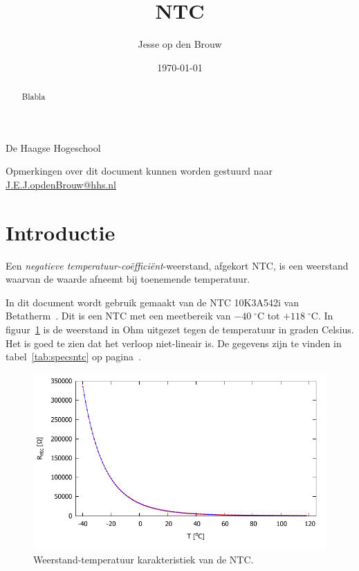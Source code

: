 \documentclass[12pt,a4paper,final,twoside,fleqn]{article}
\author{Jesse op den Brouw}
\title{NTC}
\date{\today}
\makeatletter
\def\maketitle{%
  \null
  \thispagestyle{empty}%
  \vskip 3cm
  \begin{center}\leavevmode
    {\LARGE \@title\par}%
    \vskip 1cm
    {\large \@author\par}%
    \vskip 0.03cm
    {\large De Haagse Hogeschool\par}%
    \vskip 0.03cm
    {\large \@date\par}%
  \end{center}%
  \vfill
  \null
}
\newcommand{\figscale}{1.0}
\newcommand{\mathcelc}[1]{\mbox{$#1\;^\circ\text{C}$}}
\newcommand{\ntctype}{10K3A542i}
\newcommand{\ntcman}{Betatherm}
\makeatother
\begin{document}
\raggedbottom

\maketitle
\begin{abstract}
\noindent
Blabla
\end{abstract}
\vspace*{2cm}

\clearpage
\tableofcontents
\vspace{1cm}
\listoffigures
\vspace{1cm}
\lstlistoflistings
\vfill
{\small
Opmerkingen over dit document kunnen worden gestuurd naar
\href{mailto:J.E.J.opdenBrouw@hhs.nl}{J.E.J.opdenBrouw@hhs.nl}
}
\clearpage


\section{Introductie}
Een \textsl{negatieve temperatuur-co\"effici\"ent}-weerstand, afgekort NTC,
is een weerstand waarvan de waarde afneemt bij toenemende temperatuur.

In dit document wordt gebruik gemaakt van de NTC \ntctype{} van
\ntcman~\cite{betatherm10K3A542i}. Dit is een NTC met een meetbereik van
\mathcelc{-40} tot \mathcelc{+118}. In figuur~\ref{fig:ntc_ntc_plot_celsius_fig} is
de weerstand in Ohm uitgezet tegen de temperatuur in graden Celsius. Het is goed
te zien dat het verloop niet-lineair is. De gegevens
zijn te vinden in tabel~\ref{tab:specsntc} op pagina~\pageref{tab:specsntc}.

\begin{figure}[ht!]
\centering
\includegraphics[scale=\figscale]{gnuplot/ntc_ntc_plot_celsius_fig}
\caption{Weerstand-temperatuur karakteristiek van de NTC.}
\label{fig:ntc_ntc_plot_celsius_fig}
\end{figure}
\end{document}
